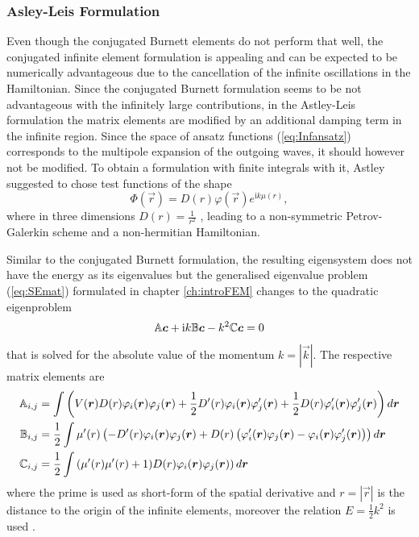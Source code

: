 \subsubsection{Asley-Leis Formulation}
Even though the conjugated Burnett elements do not perform that well, the conjugated infinite element formulation is appealing and can be expected to be numerically advantageous due to the cancellation of the infinite oscillations in the Hamiltonian.
Since the conjugated Burnett formulation seems to be not advantageous with the infinitely large contributions, in the Astley-Leis formulation the matrix elements are modified by an additional damping term in the infinite region.
Since the space of ansatz functions (\ref{eq:Infansatz}) corresponds to the multipole expansion of the outgoing waves, it should however not be modified.
To obtain a formulation with finite integrals with it, Astley suggested to chose test functions of the shape
\begin{equation} \label{eq:ALelem}
 \Phi(\vec{r}) = D(r)\varphi(\vec{r}) e^{\text{i}k\mu(r)},
\end{equation}
where in three dimensions $D(r)=\frac{1}{r^2}$ \cite{astley2}, leading to a non-symmetric Petrov-Galerkin scheme and a non-hermitian Hamiltonian.

Similar to the conjugated Burnett formulation, the resulting eigensystem does not have the energy as its eigenvalues but the generalised eigenvalue problem (\ref{eq:SEmat}) formulated in chapter \ref{ch:introFEM} changes to the quadratic eigenproblem
\begin{equation} \label{eq:SEinf}
\mathbb{A}\bm{c} +\text{i}k \mathbb{B}\bm{c}- k^2 \mathbb{C}\bm{c} =0 
\end{equation}
that is solved for the absolute value of the momentum $k=|\vec{k}|$.
The respective matrix elements are
\begin{align} \label{eq:InFEMmatrix}
\mathbb{A}_{i,j}& =\int \left(V(\bm{r}) D(r) \varphi_i(\bm{r}) \varphi_j(\bm{r}) 
                 +\frac 12 D'(r) \varphi_i(\bm{r})\varphi'_j(\bm{r})
                 +\frac 12 D(r) \varphi'_i(\bm{r})\varphi'_j(\bm{r}) \right) d\bm{r}\\
\mathbb{B}_{i,j}&=\frac 12 \int \mu'(r)\left(-D'(r) \varphi_i(\bm{r})\varphi_j(\bm{r})
                + D(r) \left(\varphi'_i(\bm{r})\varphi_j(\bm{r}) -\varphi_i(\bm{r})\varphi'_j(\bm{r})\right) \right) d\bm{r} \\
\mathbb{C}_{i,j}&= \frac 12 \int \left( \mu'(r) \mu'(r) + 1) D(r) \varphi_i(\bm{r}) \varphi_j(\bm{r})\right) d\bm{r}
\end{align}
where the prime is used as short-form of the spatial derivative and $r=|\vec{r}|$ is the distance to the origin of the infinite elements, moreover the relation $E=\frac 12 k^2$ is used \cite{dreyer}.

